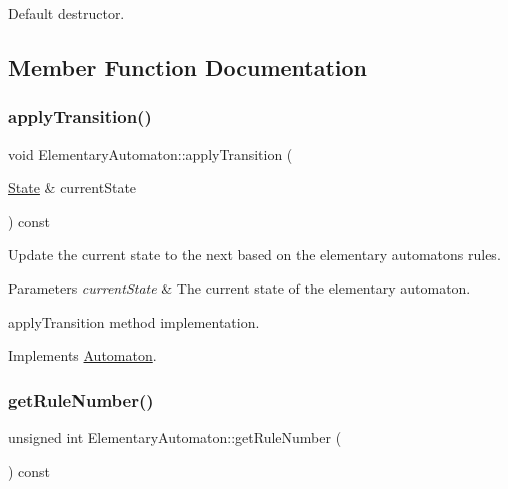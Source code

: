 Default destructor. 

\subsection{Member Function Documentation}
\mbox{\label{class_elementary_automaton_a338559546b22deef0f3eb3c0d7d20882}} 
\subsubsection{\texorpdfstring{apply\+Transition()}{applyTransition()}}
{\footnotesize\ttfamily void Elementary\+Automaton\+::apply\+Transition (\begin{DoxyParamCaption}\item[{\mbox{\hyperlink{class_state}{State}} \&}]{current\+State }\end{DoxyParamCaption}) const\hspace{0.3cm}{\ttfamily [virtual]}}

Update the current state to the next based on the elementary automaton\textquotesingle{}s rules.


\begin{DoxyParams}{Parameters}
{\em current\+State} & The current state of the elementary automaton.\\
\hline
\end{DoxyParams}
apply\+Transition method implementation. 

Implements \mbox{\hyperlink{class_automaton_aaf6b5ebd7a820867bfaab0f6892cc0b8}{Automaton}}.

\mbox{\label{class_elementary_automaton_a38f3a217931e1ccf52fcdbad01d7ff55}} 
\subsubsection{\texorpdfstring{get\+Rule\+Number()}{getRuleNumber()}}
{\footnotesize\ttfamily unsigned int Elementary\+Automaton\+::get\+Rule\+Number (\begin{DoxyParamCaption}{ }\end{DoxyParamCaption}) const\hspace{0.3cm}{\ttfamily [inline]}}

